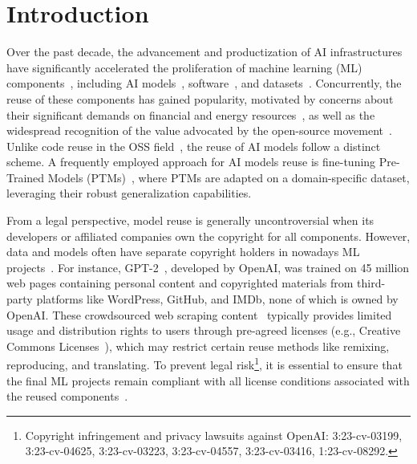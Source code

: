 \section{Introduction}
Over the past decade, the advancement and productization of AI infrastructures have significantly accelerated the proliferation of machine learning (ML) components~\cite{jiang2023empirical}, including AI models~\cite{rombach2022high, touvron2023llama}, software~\cite{wolf2020transformers, he2022fastermoe}, and datasets~\cite{gao2020the, schuhmann2022laion}.
Concurrently, the reuse of these components has gained popularity, motivated by concerns about their significant demands on financial and energy resources~\cite{strubell2019energy}, as well as the widespread recognition of the value advocated by the open-source movement~\cite{rosen2005open}.
Unlike code reuse in the OSS field~\cite{perens1999open}, the reuse of AI models follow a distinct scheme.
A frequently employed approach for AI models reuse is fine-tuning Pre-Trained Models (PTMs)~\cite{han2021pre, touvron2023llama}, where PTMs are adapted on a domain-specific dataset, leveraging their robust generalization capabilities. 

From a legal perspective, model reuse is generally uncontroversial when its developers or affiliated companies own the copyright for all components.
However, data and models often have separate copyright holders in nowadays ML projects~\cite{rajbahadur2021can, radford2019language, scao2022bloom, zeng2023glm}.
For instance, GPT-2~\cite{radford2019language}, developed by OpenAI, was trained on 45 million web pages containing personal content and copyrighted materials from third-party platforms like WordPress, GitHub, and IMDb, none of which is owned by OpenAI. %
These crowdsourced web scraping content~\cite{wang2023easyspider} typically provides limited usage and distribution rights to users through pre-agreed licenses (e.g., Creative Commons Licenses~\cite{creative2023list}), which may restrict certain reuse methods like remixing, reproducing, and translating. 
To prevent legal risk\footnote{Copyright infringement and privacy lawsuits against OpenAI: 3:23-cv-03199, 3:23-cv-04625, 3:23-cv-03223, 3:23-cv-04557, 3:23-cv-03416, 1:23-cv-08292.}, it is essential to ensure that the final ML projects remain compliant with all license conditions associated with the reused components~\cite{cui2023empirical, mathur2012empirical, kapitsaki2017automating}.

